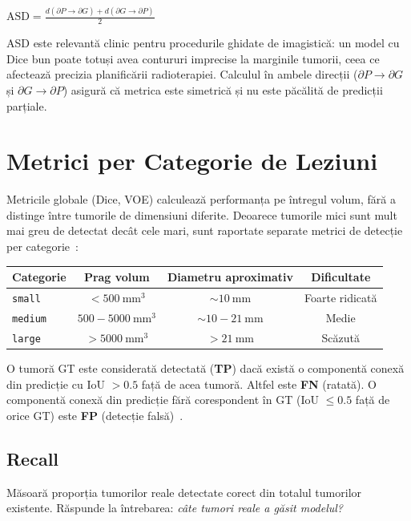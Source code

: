 \documentclass[12pt, a4paper]{report}
\newcommand{\formula}[1]{%
    \begin{center}
        \colorbox{codebackground}{%
            \parbox{0.88\textwidth}{\centering\vspace{4pt}$#1$\vspace{4pt}}%
        }
    \end{center}
}
\begin{document}
\formula{
    \text{ASD} = \frac{
        d(\partial P \to \partial G) + d(\partial G \to \partial P)
    }{2}
}

ASD este relevantă clinic pentru procedurile ghidate de imagistică: un model cu Dice bun
poate totuși avea contururi imprecise la marginile tumorii, ceea ce afectează precizia
planificării radioterapiei. Calculul în ambele direcții ($\partial P \to \partial G$ și
$\partial G \to \partial P$) asigură că metrica este simetrică și nu este păcălită
de predicții parțiale.

\section{Metrici per Categorie de Leziuni}

Metricile globale (Dice, VOE) calculează performanța pe întregul volum, fără a distinge
între tumorile de dimensiuni diferite. Deoarece tumorile mici sunt mult mai greu de detectat
decât cele mari, sunt raportate separate metrici de detecție per categorie~\cite{bilic2023lits}:

\begin{center}
\begin{tabular}{lccc}
    \toprule
    \textbf{Categorie} & \textbf{Prag volum} & \textbf{Diametru aproximativ} & \textbf{Dificultate} \\
    \midrule
    \texttt{small}  & $< 500\ \text{mm}^3$          & $\sim 10\ \text{mm}$    & Foarte ridicată \\
    \texttt{medium} & $500 - 5000\ \text{mm}^3$     & $\sim 10-21\ \text{mm}$ & Medie \\
    \texttt{large}  & $> 5000\ \text{mm}^3$         & $> 21\ \text{mm}$       & Scăzută \\
    \bottomrule
\end{tabular}
\end{center}

O tumoră GT este considerată detectată (\textbf{TP}) dacă există o componentă conexă din
predicție cu IoU $> 0.5$ față de acea tumoră. Altfel este \textbf{FN} (ratată).
O componentă conexă din predicție fără corespondent în GT (IoU $\leq 0.5$ față de orice GT)
este \textbf{FP} (detecție falsă)~\cite{bilic2023lits}.

\subsection{Recall}
\vspace{4pt}
\begin{infobox}
Măsoară proporția tumorilor reale detectate corect din totalul
tumorilor existente. Răspunde la întrebarea: \textit{câte tumori
reale a găsit modelul?}
\end{infobox}
\end{document}
